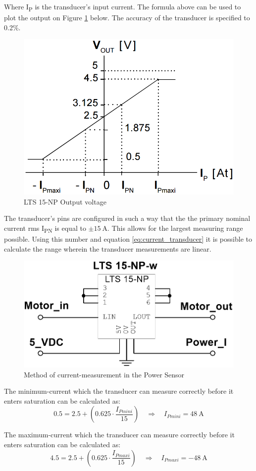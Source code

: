 Where I\textsubscript{P} is the transducer's input current. The formula above can be used to plot the output on Figure \ref{fig:LTS_output} below. The accuracy of the transducer is specified to 0.2\%.

\begin{figure}[H]
	\centering
	\includegraphics[width=0.4\linewidth]{Hardware/Pictures/LTS_output}
	\caption{LTS 15-NP Output voltage}
	\label{fig:LTS_output}
\end{figure}

The transducer's pins are configured in such a way that the the primary nominal current rms I\textsubscript{PN} is equal to $\pm \SI{15}{\ampere}$. This allows for the largest measuring range possible. Using this number and equation \ref{eq:current_transducer} it is possible to calculate the range wherein the transducer measurements are linear.

\begin{figure}[H]
	\centering
	\includegraphics[width=0.6\linewidth]{Hardware/Pictures/PowerSensor_Current}
	\caption{Method of current-measurement in the Power Sensor}
	\label{fig:PowerSensorCurrent}
\end{figure}

The minimum-current which the transducer can measure correctly before it enters saturation can be calculated as:
\begin{equation}
	0.5 = 2.5 + \left( 0.625 \cdot \frac{I_{Pmini}}{15} \right) \quad \Rightarrow \quad I_{Pmini} = \SI{48}{\ampere}
\end{equation}

The maximum-current which the transducer can measure correctly before it enters saturation can be calculated as:
\begin{equation}
	4.5 = 2.5 + \left( 0.625 \cdot \frac{I_{Pmaxi}}{15} \right) \quad \Rightarrow \quad I_{Pmaxi} = \SI{-48}{\ampere}
\end{equation}


